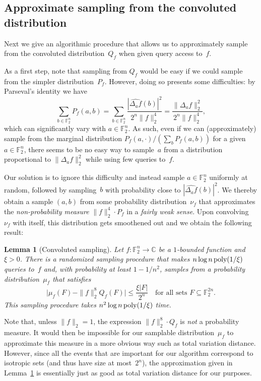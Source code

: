 \documentclass[11pt]{amsart}
\newcommand{\C}{\mathbb{C}} %
\newcommand{\F}{\mathbb{F}} %
\newcommand{\poly}{\mbox{\rm poly}}
\theoremstyle{plain}
\newtheorem{lemma}[theorem]{Lemma}
\theoremstyle{definition}
\theoremstyle{remark}
\begin{document}
\subsection{Approximate sampling from the convoluted distribution} \label{sec:Convoluted}

Next we give an algorithmic procedure that allows us to approximately sample from the convoluted distribution~$Q_f$ when given query access to~$f$.

As a first step, note that sampling from $Q_f$ would be easy if we could sample from the simpler distribution~$P_f$.
However, doing so presents some difficulties:
by Parseval's identity we have
$$\sum_{b\in \F_2^n} P_f(a, b) = \sum_{b\in \F_2^n} \frac{|\widehat{\Delta_a f}(b)|^2}{2^n \|f\|_2^4} = \frac{\|\Delta_a f\|_2^2}{2^n \|f\|_2^4},$$
which can significantly vary with $a\in \F_2^n$.
As such, even if we can (approximately) sample from the marginal distribution $P_f(a, \cdot)/(\sum_{b} P_f(a, b))$ for a given $a\in \F_2^n$, there seems to be no easy way to sample~$a$ from a distribution proportional to $\|\Delta_a f\|_2^2$ while using few queries to~$f$.

Our solution is to ignore this difficulty and instead sample $a\in \F_2^n$ uniformly at random, followed by sampling~$b$ with probability close to $|\widehat{\Delta_a f}(b)|^2$.
We thereby obtain a sample $(a, b)$ from some probability distribution~$\nu_f$ that approximates the \emph{non-probability measure} $\|f\|_2^4\cdot  P_f$ in a \emph{fairly weak sense}.
Upon convolving~$\nu_f$ with itself, this distribution gets smoothened out and we obtain the following result:

\begin{lemma}[Convoluted sampling] \label{lem:sampling}
    Let $f: \F_2^n \to \C$ be a $1$-bounded function and $\xi>0$.
    There is a randomized sampling procedure that makes $n\log n\, \poly(1/\xi)$ queries to~$f$ and, with probability at least $1-1/n^2$, samples from a probability distribution~$\mu_f$ that satisfies
    \begin{equation*}
    \big|\mu_f(F) - \|f\|_2^8 Q_f(F)\big| \leq \frac{\xi |F|}{2^n} \quad \text{for all sets $F\subseteq \F_2^{2n}$.}
    \end{equation*}
    This sampling procedure takes $n^2 \log n\, \poly(1/\xi)$ time.
\end{lemma}

Note that, unless $\|f\|_2 = 1$, the expression $\|f\|_2^8 \cdot Q_f$ is \emph{not} a probability measure.
It would then be impossible for our samplable distribution~$\mu_f$ to approximate this measure in a more obvious way such as total variation distance.
However, since all the events that are important for our algorithm correspond to isotropic sets (and thus have size at most~$2^n$), the approximation given in Lemma~\ref{lem:sampling} is essentially just as good as total variation distance for our purposes.
\end{document}
